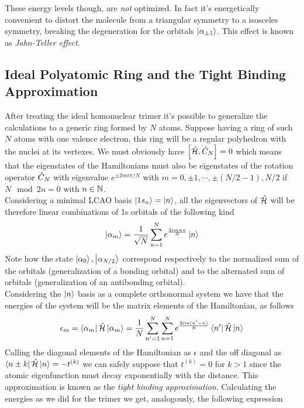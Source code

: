 \documentclass[../qm.tex]{subfiles}
\begin{document}
	These energy levels though, are \emph{not} optimized. In fact it's energetically convenient to distort the molecule from a triangular symmetry to a isosceles symmetry, breaking the degeneration for the orbitals $\ket{\alpha_{\pm1}}$. This effect is known as \textit{Jahn-Teller effect}.
	\subsection{Ideal Polyatomic Ring and the Tight Binding Approximation}
	After treating the ideal homonuclear trimer it's possible to generalize the calculations to a generic ring formed by $N$ atoms. Suppose having a ring of such $N$ atoms with one valence electron, this ring will be a regular polyhedron with the nuclei at its vertexes. We must obviously have $\comm{\opr{\ham}}{\opr{C}_N}=0$ which means that the eigenstates of the Hamiltonians must also be eigenstates of the rotation operator $\hat{C}_N$ with eigenvalue $e^{\pm2mi\pi/N}$ with $m=0,\pm1,\cdots,\pm(N/2-1),N/2$ if $N\mod 2n=0$ with $n\in\mathbb{N}$.\\
	Considering a minimal LCAO basis $\ket{1s_n}=\ket{n}$, all the eigenvectors of $\hat{\mathcal{H}}$ will be therefore linear combinations of 1s orbitals of the following kind
	\begin{equation}
		\ket{\alpha_m}=\frac{1}{\sqrt{N}}\sum_{n=1}^Ne^{\frac{2imn\pi}{N}}\ket{n}
		\label{eq:polyatomiccyclic}
	\end{equation}
	Note how the state $\ket{\alpha_0},\ket{\alpha_{N/2}}$ correspond respectively to the normalized sum of the orbitals (generalization of a bonding orbital) and to the alternated sum of orbitals (generalization of an antibonding orbital).\\
	Considering the $\ket{n}$ basis as a complete orthonormal system we have that the energies of the system will be the matrix elements of the Hamiltonian, as follows
	\begin{equation}
		\epsilon_m=\bra{\alpha_m}\hat{\mathcal{H}}\ket{\alpha_m}=\frac{1}{N}\sum_{n'=1}^N\sum_{n=1}^Ne^{\frac{2im(n'-n)}{N}}\bra{n'}\hat{\mathcal{H}}\ket{n}
		\label{eq:cyclicenergies}
	\end{equation}
	Calling the diagonal elements of the Hamiltonian as $\epsilon$ and the off diagonal as $\bra{n\pm k}\hat{\mathcal{H}}\ket{n}=-t^{(k)}$ we can safely suppose that $t^{(k)}=0$ for $k>1$ since the atomic eigenfunction must decay exponentially with the distance. This approximation is known as the \textit{tight binding approximation}. Calculating the energies as we did for the trimer we get, analogously, the following expression
\end{document}
